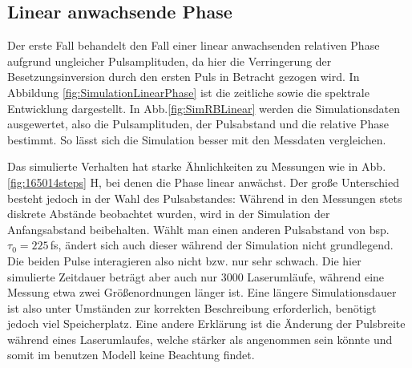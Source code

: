 \documentclass[bachelor,       %
               twoside,        %
               BCOR10mm,       %
               liststotoc,nomtotoc,bibtotoc, %
               english,ngerman, %
               final,          %
               ]{GAUBM}
\begin{document}
\clearpage
\subsection{Linear anwachsende Phase}
Der erste Fall behandelt den Fall einer linear anwachsenden relativen Phase aufgrund ungleicher Pulsamplituden, da hier die Verringerung der Besetzungsinversion durch den ersten Puls in Betracht gezogen wird.
In Abbildung \ref{fig:SimulationLinearPhase} ist die zeitliche sowie die spektrale Entwicklung dargestellt.
In Abb.\ref{fig:SimRBLinear} werden die Simulationsdaten ausgewertet, also die Pulsamplituden, der Pulsabstand und die relative Phase bestimmt.
So lässt sich die Simulation besser mit den Messdaten vergleichen.

Das simulierte Verhalten hat starke Ähnlichkeiten zu Messungen wie in Abb.\ref{fig:165014steps} H, bei denen die Phase linear anwächst.
Der große Unterschied besteht jedoch in der Wahl des Pulsabstandes:
Während in den Messungen stets diskrete Abstände beobachtet wurden, wird in der Simulation der Anfangsabstand beibehalten.
Wählt man einen anderen Pulsabstand von bsp. $\tau_0=225\,$fs, ändert sich auch dieser während der Simulation nicht grundlegend.
Die beiden Pulse interagieren also nicht bzw. nur sehr schwach.
Die hier simulierte Zeitdauer beträgt aber auch nur 3000 Laserumläufe, während eine Messung etwa zwei Größenordnungen länger ist.
Eine längere Simulationsdauer ist also unter Umständen zur korrekten Beschreibung erforderlich, benötigt jedoch viel Speicherplatz.
Eine andere Erklärung ist die Änderung der Pulsbreite während eines Laserumlaufes, welche stärker als angenommen sein könnte und somit im benutzen Modell keine Beachtung findet.
\end{document}
